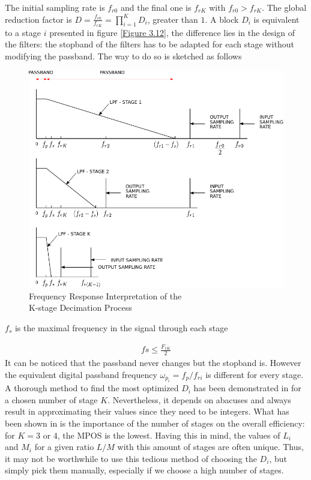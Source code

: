 \begin{itemize}
\begin{enumerate}
 	The initial sampling rate is $f_{r0}$ and the final one is $f_{rK}$ with  $f_{r0} > f_{rK}$. The global reduction factor is $D = \frac{f_{r0}}{f_{rK}} = \prod_{i=1}^{K} D_i$, greater than $1$. A block $D_i$ is equivalent to a stage $i$ presented in figure \ref{Figure 3.12}, the difference lies in the design of the filters: the stopband of the filters has to be adapted for each stage without modifying the passband. The way to do so is sketched as follows\\
 	
 	\begin{figure}[ht!]
 		\centering
 		\hspace*{15mm}
 		\includegraphics[scale = 1]{multistage_sup1_2.pdf}
 		\caption{Frequency Response Interpretation of the \\K-stage Decimation Process}\label{Figure 3.14}
 	\end{figure}
 
 $f_s$ is the maximal frequency in the signal through each stage 
 
 \begin{align}
 	fs \leq \frac{F_{rK}}{2}
 \end{align}
 It can be noticed that the passband never changes but the stopband is. However the equivalent digital passband frequency $\omega_{p_i} = f_p/f_{ri}$ is different for every stage. A thorough method to find the most optimized $D_i$ has been demonstrated in \cite{crochiere} for a chosen number of stage $K$. Nevertheless, it depends on abacuses and always result in approximating their values since they need to be integers. What has been shown in \cite{turek} is the importance of the number of stages on the overall efficiency: for $K = 3$ or $4$, the MPOS is the lowest. Having this in mind, the values of $L_i$ and $M_i$ for a given ratio $L/M$ with this amount of stages are often unique. Thus, it may not be worthwhile to use this tedious method of choosing the $D_i$, but simply pick them manually, especially if we choose a high number of stages.\\
 	

\end{enumerate}
\end{itemize}
